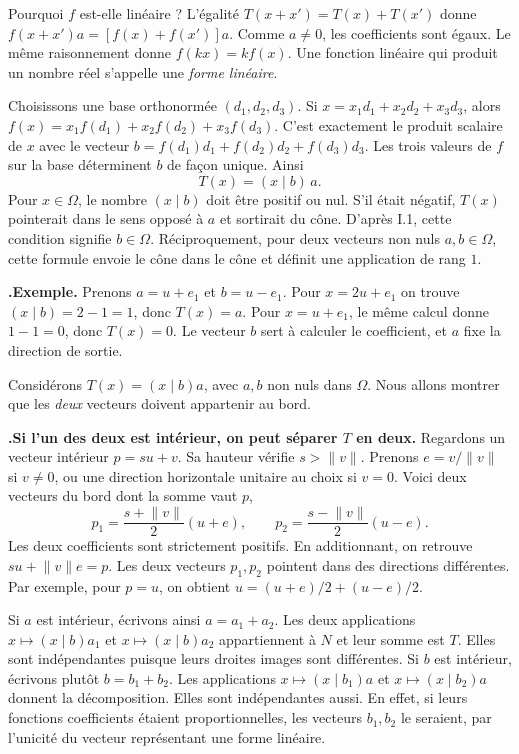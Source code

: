 \documentclass[a4paper,12pt]{article}
\newcommand{\Om}{\Omega}
\newcommand{\norm}[1]{\lVert #1\rVert}
\newcommand{\ps}[2]{(#1\mid #2)}
\newcounter{pas}
\newcommand{\etape}[1]{\par\Needspace{2.25\baselineskip}\smallskip\stepcounter{pas}%
  \textbf{\textcolor{deep}{\thepas.\enspace #1}}\enspace\ignorespaces}
\begin{document}
Pourquoi $f$ est-elle linéaire ? L'égalité $T(x+x')=T(x)+T(x')$ donne
$f(x+x')a=[f(x)+f(x')]a$. Comme $a\ne0$, les coefficients sont égaux. Le même
raisonnement donne $f(kx)=kf(x)$. Une fonction linéaire qui produit un nombre
réel s'appelle une \emph{forme linéaire}.

Choisissons une base orthonormée $(d_1,d_2,d_3)$. Si $x=x_1d_1+x_2d_2+x_3d_3$,
alors $f(x)=x_1f(d_1)+x_2f(d_2)+x_3f(d_3)$. C'est exactement le
produit scalaire de $x$ avec le vecteur $b=f(d_1)d_1+f(d_2)d_2+f(d_3)d_3$.
Les trois valeurs de $f$ sur la base déterminent $b$ de façon unique. Ainsi
\[
                         T(x)=\ps{x}{b}\,a.
\]
Pour $x\in\Om$, le nombre $\ps{x}{b}$ doit être positif ou nul. S'il était
négatif, $T(x)$ pointerait dans le sens opposé à $a$ et sortirait du cône.
D'après I.1, cette condition signifie $b\in\Om$. Réciproquement, pour deux
vecteurs non nuls $a,b\in\Om$, cette formule envoie le cône dans le cône et
définit une application de rang $1$.

\etape{Exemple.}
Prenons $a=u+e_1$ et $b=u-e_1$. Pour $x=2u+e_1$ on trouve
$\ps{x}{b}=2-1=1$, donc $T(x)=a$. Pour $x=u+e_1$, le même calcul donne
$1-1=0$, donc $T(x)=0$. Le vecteur $b$ sert à calculer le coefficient,
et $a$ fixe la direction de sortie.

Considérons $T(x)=\ps{x}{b}a$, avec $a,b$ non nuls dans $\Om$. Nous allons
montrer que les \emph{deux} vecteurs doivent appartenir au bord.

\etape{Si l'un des deux est intérieur, on peut séparer $T$ en deux.}
Regardons un vecteur intérieur $p=su+v$. Sa hauteur vérifie $s>\norm{v}$.
Prenons $e=v/\norm{v}$ si $v\ne0$, ou une direction horizontale unitaire au choix
si $v=0$. Voici deux vecteurs du bord dont la somme vaut $p$,
\[
       p_1=\frac{s+\norm{v}}2(u+e),\qquad
       p_2=\frac{s-\norm{v}}2(u-e).
\]
Les deux coefficients sont strictement positifs. En additionnant, on retrouve
$su+\norm{v}e=p$. Les deux vecteurs $p_1,p_2$ pointent dans des directions
différentes. Par exemple, pour $p=u$, on obtient $u=(u+e)/2+(u-e)/2$.

Si $a$ est intérieur, écrivons ainsi $a=a_1+a_2$. Les deux applications
$x\mapsto\ps{x}{b}a_1$ et $x\mapsto\ps{x}{b}a_2$ appartiennent à $N$ et leur
somme est $T$. Elles sont indépendantes puisque leurs droites images sont
différentes. Si $b$ est intérieur, écrivons plutôt $b=b_1+b_2$. Les applications
$x\mapsto\ps{x}{b_1}a$ et $x\mapsto\ps{x}{b_2}a$ donnent la décomposition.
Elles sont indépendantes aussi. En effet, si leurs fonctions coefficients
étaient proportionnelles, les vecteurs $b_1,b_2$ le seraient, par l'unicité du
vecteur représentant une forme linéaire.
\end{document}
